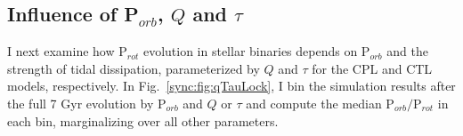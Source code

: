 

\subsection{Influence of P$_{orb}$, $Q$ and $\tau$} \label{sync:sec:qTauMaps}

I next examine how P$_{rot}$ evolution in stellar binaries depends on P$_{orb}$ and the strength of tidal dissipation, parameterized by $Q$ and $\tau$ for the CPL and CTL models, respectively. In Fig.~\ref{sync:fig:qTauLock}, I bin the simulation results after the full 7 Gyr evolution by P$_{orb}$ and $Q$ or $\tau$ and compute the median P$_{orb}/$P$_{rot}$ in each bin, marginalizing over all other parameters.

